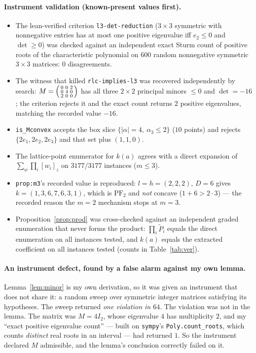 \documentclass[11pt]{article}
\theoremstyle{plain}
\theoremstyle{definition}
\newcommand{\PFtwo}{\mathrm{PF}_2}
\newcommand{\Pt}{\widetilde P}
\begin{document}
\paragraph{Instrument validation (known-present values first).}
\begin{itemize}
\item The lean-verified criterion \texttt{l3-det-reduction} ($3\times3$ symmetric with
nonnegative entries has at most one positive eigenvalue iff $e_2\le0$ and $\det\ge0$) was
checked against an independent exact Sturm count of positive roots of the characteristic
polynomial on $600$ random nonnegative symmetric $3\times3$ matrices: $0$ disagreements.
\item The witness that killed \texttt{rlc-implies-l3} was recovered independently by
search: $M=\begin{psmallmatrix}0&0&2\\0&4&0\\2&0&0\end{psmallmatrix}$ has all three
$2\times2$ principal minors $\le0$ and $\det=-16$; the criterion rejects it and the exact
count returns $2$ positive eigenvalues, matching the recorded value $-16$.
\item \texttt{is\_Mconvex} accepts the box slice $\{|\alpha|=4,\ \alpha_3\le2\}$ ($10$
points) and rejects $\{2e_1,2e_2,2e_3\}$ and that set plus $(1,1,0)$.
\item The lattice-point enumerator for $k(a)$ agrees with a direct expansion of
$\sum_{w}\prod_i[w_i]_z$ on $3177/3177$ instances ($m\le3$).
\item \texttt{prop:m3}'s recorded value is reproduced: $l=h=(2,2,2)$, $D=6$ gives
$k=(1,3,6,7,6,3,1)$, which is $\PFtwo$ and \emph{not} concave ($1+6>2\cdot3$) --- the
recorded reason the $m=2$ mechanism stops at $m=3$.
\item Proposition~\ref{prop:prod} was cross-checked against an independent graded
enumeration that never forms the product: $\prod_i\Pt_i$ equals the direct enumeration on
all instances tested, and $k(a)$ equals the extracted coefficient on all instances tested
(counts in Table~\ref{tab:ver}).
\end{itemize}

\paragraph{An instrument defect, found by a false alarm against my own lemma.}
Lemma~\ref{lem:minor} is my own derivation, so it was given an instrument that does not
share it: a random sweep over symmetric integer matrices satisfying its hypotheses. The
sweep returned \emph{one violation in $64$}. The violation was not in the lemma. The
matrix was $M=4I_2$, whose eigenvalue $4$ has multiplicity $2$, and my ``exact positive
eigenvalue count'' --- built on \texttt{sympy}'s \texttt{Poly.count\_roots}, which counts
\emph{distinct} real roots in an interval --- had returned $1$. So the instrument declared
$M$ admissible, and the lemma's conclusion correctly failed on it.
\end{document}
